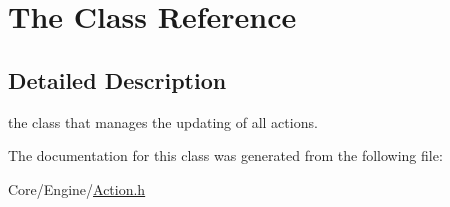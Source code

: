 \hypertarget{classThe}{\section{The Class Reference}
\label{classThe}
}


\subsection{Detailed Description}
the class that manages the updating of all actions. 

The documentation for this class was generated from the following file\-:\begin{DoxyCompactItemize}
\item 
Core/\-Engine/\hyperlink{Action_8h}{Action.\-h}\end{DoxyCompactItemize}

